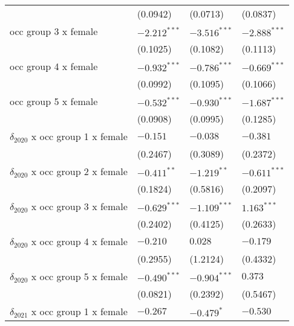 \begin{tabular}{llll}
                                       &           (0.0942) &           (0.0713) &           (0.0837) \\
occ group 3 x female                   &     $-2.212^{***}$ &     $-3.516^{***}$ &     $-2.888^{***}$ \\
                                       &           (0.1025) &           (0.1082) &           (0.1113) \\
occ group 4 x female                   &     $-0.932^{***}$ &     $-0.786^{***}$ &     $-0.669^{***}$ \\
                                       &           (0.0992) &           (0.1095) &           (0.1066) \\
occ group 5 x female                   &     $-0.532^{***}$ &     $-0.930^{***}$ &     $-1.687^{***}$ \\
                                       &           (0.0908) &           (0.0995) &           (0.1285) \\
$\delta_{2020}$ x occ group 1 x female &           $-0.151$ &           $-0.038$ &           $-0.381$ \\
                                       &           (0.2467) &           (0.3089) &           (0.2372) \\
$\delta_{2020}$ x occ group 2 x female &      $-0.411^{**}$ &      $-1.219^{**}$ &     $-0.611^{***}$ \\
                                       &           (0.1824) &           (0.5816) &           (0.2097) \\
$\delta_{2020}$ x occ group 3 x female &     $-0.629^{***}$ &     $-1.109^{***}$ &      $1.163^{***}$ \\
                                       &           (0.2402) &           (0.4125) &           (0.2633) \\
$\delta_{2020}$ x occ group 4 x female &           $-0.210$ &            $0.028$ &           $-0.179$ \\
                                       &           (0.2955) &           (1.2124) &           (0.4332) \\
$\delta_{2020}$ x occ group 5 x female &     $-0.490^{***}$ &     $-0.904^{***}$ &            $0.373$ \\
                                       &           (0.0821) &           (0.2392) &           (0.5467) \\
$\delta_{2021}$ x occ group 1 x female &           $-0.267$ &         $-0.479^*$ &           $-0.530$ \\

\end{tabular}
